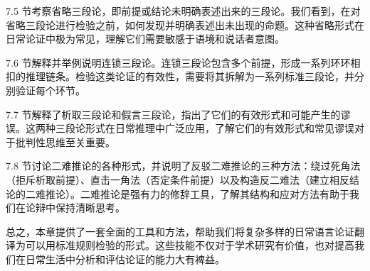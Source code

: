 7.5 节考察省略三段论，即前提或结论未明确表述出来的三段论。我们看到，在对省略三段论进行检验之前，如何发现并明确表述出未出现的命题。这种省略形式在日常论证中极为常见，理解它们需要敏感于语境和说话者意图。

7.6 节解释并举例说明连锁三段论。连锁三段论包含多个前提，形成一系列环环相扣的推理链条。检验这类论证的有效性，需要将其拆解为一系列标准三段论，并分别验证每个环节。

7.7 节解释了析取三段论和假言三段论，指出了它们的有效形式和可能产生的谬误。这两种三段论形式在日常推理中广泛应用，了解它们的有效形式和常见谬误对于批判性思维至关重要。

7.8 节讨论二难推论的各种形式，并说明了反驳二难推论的三种方法：绕过死角法（拒斥析取前提）、直击一角法（否定条件前提）以及构造反二难法（建立相反结论的二难推论）。二难推论是强有力的修辞工具，了解其结构和应对方法有助于我们在论辩中保持清晰思考。

总之，本章提供了一套全面的工具和方法，帮助我们将复杂多样的日常语言论证翻译为可以用标准规则检验的形式。这些技能不仅对于学术研究有价值，也对提高我们在日常生活中分析和评估论证的能力大有裨益。 

\printbibliography[heading=subbibliography,title={第7章参考文献}] 
